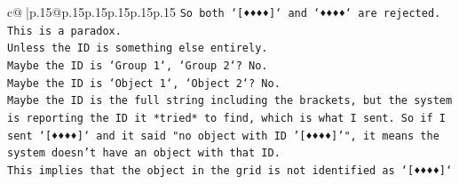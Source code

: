 \documentclass{article}
\begin{document}
{\begin{supertabular}{c@{$\;$}|p{.15\linewidth}@{}p{.15\linewidth}p{.15\linewidth}p{.15\linewidth}p{.15\linewidth}p{.15\linewidth}}
{{{\texttt{So both `{[}♦♦♦♦{]}` and `♦♦♦♦` are rejected.} \\
\texttt{This is a paradox.} \\
\texttt{Unless the ID is something else entirely.} \\
\texttt{Maybe the ID is `Group 1`, `Group 2`? No.} \\
\texttt{Maybe the ID is `Object 1`, `Object 2`? No.} \\
\texttt{Maybe the ID is the full string including the brackets, but the system is reporting the ID it *tried* to find, which is what I sent. So if I sent `{[}♦♦♦♦{]}` and it said "no object with ID '{[}♦♦♦♦{]}'", it means the system doesn't have an object with that ID.} \\
\texttt{This implies that the object in the grid is not identified as `{[}♦♦♦♦{]}`} \\
            }
        }
    }
     \\ \\


\end{supertabular}}
\end{document}
